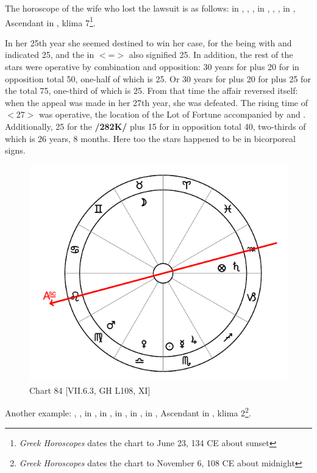 The horoscope of the wife who lost the lawsuit is as follows: \Sun\xspace in \Cancer, \Moon, \Saturn, \Jupiter\xspace in
\Sagittarius, \Mars, \Venus, \Mercury\xspace in \Gemini, Ascendant in \Capricorn, klima 7\footnote{\textit{Greek Horoscopes} dates the chart to June 23, 134 CE about sunset}.

In her 25th year she seemed destined to win her case, for the \Moon\xspace being with \Jupiter\xspace and \Saturn\xspace indicated 25, and the \Sun\xspace in \Cancer $<$=\Moon$>$ also signified 25. In addition, the rest of the stars were operative by combination and opposition: 30 years for \Saturn\xspace plus 20 for \Mercury\xspace in opposition total 50, one-half of which is 25. Or 30
years for \Saturn\xspace plus 20 for \Mercury\xspace plus 25 for the \Moon\xspace total 75, one-third of which is 25. From that time the affair reversed itself: when the appeal was made in her 27th year, she was defeated. The rising time of \Gemini\xspace $<$27$>$ was operative, the location of the Lot of Fortune accompanied by \Mars\xspace and \Mercury. Additionally, 25 for the \Moon\xspace \textbf{/282K/} plus 15 for \Mars\xspace in opposition total 40, two-thirds of which is 26 years, 8 months. Here too the stars happened to be in bicorporeal signs.

\newpage
\begin{figure}
\centering
\vspace{0pt}
\includegraphics[width=.68\textwidth]{charts/7_6_03}
\caption{Chart 84 [VII.6.3, GH L108, XI]}
\label{fig:chart84}
\end{figure} 

Another example: \Sun, \Mercury, \Jupiter\xspace in \Scorpio, \Moon\xspace in \Taurus, \Saturn\xspace in \Aquarius, \Mars\xspace in \Virgo, \Venus\xspace in \Libra, Ascendant in \Leo, klima 2\footnote{\textit{Greek Horoscopes} dates the chart to November 6, 108 CE about midnight}.


